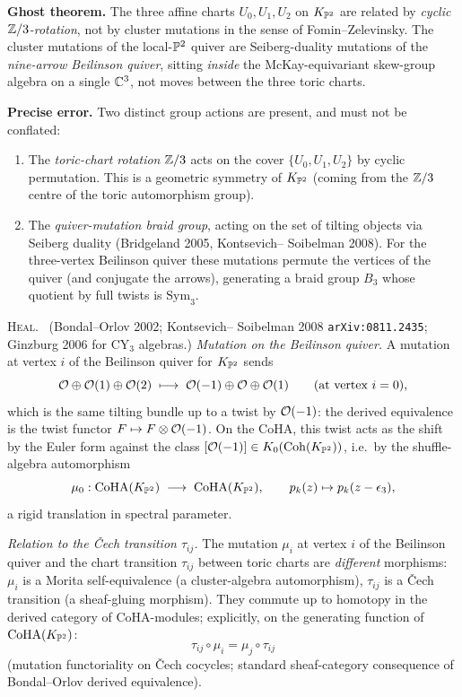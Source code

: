 \textbf{Ghost theorem.} The three affine charts $U_0,U_1,U_2$ on
$K_{\mathbb{P}^2}$ are related by \emph{cyclic $\mathbb{Z}/3$-rotation}, not by
cluster mutations in the sense of Fomin--Zelevinsky. The cluster
mutations of the local-$\mathbb{P}^2$ quiver are Seiberg-duality mutations of
the \emph{nine-arrow Beilinson quiver}, sitting \emph{inside} the
McKay-equivariant skew-group algebra on a single $\mathbb{C}^3$, not moves
between the three toric charts.

\textbf{Precise error.} Two distinct group actions are present, and must
not be conflated:
\begin{enumerate}
\item The \emph{toric-chart rotation} $\mathbb{Z}/3$ acts on the cover
$\{U_0,U_1,U_2\}$ by cyclic permutation. This is a geometric symmetry
of $K_{\mathbb{P}^2}$ (coming from the $\mathbb{Z}/3$ centre of the toric
automorphism group).
\item The \emph{quiver-mutation braid group}, acting on the set of
tilting objects via Seiberg duality (Bridgeland 2005, Kontsevich--
Soibelman 2008). For the three-vertex Beilinson quiver these mutations
permute the vertices of the quiver (and conjugate the arrows),
generating a braid group $B_3$ whose quotient by full twists is
$\mathrm{Sym}_3$.
\end{enumerate}

\textsc{Heal.} \ClaimStatusTheorem\ (Bondal--Orlov 2002; Kontsevich--
Soibelman 2008 \texttt{arXiv:0811.2435}; Ginzburg 2006 for CY$_3$
algebras.) \emph{Mutation on the Beilinson quiver.} A mutation at vertex
$i$ of the Beilinson quiver for $K_{\mathbb{P}^2}$ sends
\[
\mathcal{O}\oplus\mathcal{O}(1)\oplus\mathcal{O}(2)\;\longmapsto\;\mathcal{O}(-1)\oplus\mathcal{O}\oplus\mathcal{O}(1)
\qquad\text{(at vertex }i=0),
\]
which is the same tilting bundle up to a twist by $\mathcal{O}(-1)$: the
derived equivalence is the twist functor $F\mapsto F\otimes\mathcal{O}(-1)$.
On the CoHA, this twist acts as the shift by the Euler form against
the class $[\mathcal{O}(-1)]\in K_0(\mathrm{Coh}(K_{\mathbb{P}^2}))$, i.e.\ by the shuffle-
algebra automorphism
\[
\mu_0:\mathrm{CoHA}(K_{\mathbb{P}^2})\;\longrightarrow\;\mathrm{CoHA}(K_{\mathbb{P}^2}),
\qquad
p_k(z)\mapsto p_k(z-\epsilon_3),
\]
a rigid translation in spectral parameter.

\emph{Relation to the \v Cech transition $\tau_{ij}$.} The mutation
$\mu_i$ at vertex $i$ of the Beilinson quiver and the chart transition
$\tau_{ij}$ between toric charts are \emph{different} morphisms: $\mu_i$
is a Morita self-equivalence (a cluster-algebra automorphism), $\tau_{ij}$
is a \v Cech transition (a sheaf-gluing morphism). They commute up to
homotopy in the derived category of CoHA-modules; explicitly, on the
generating function of $\mathrm{CoHA}(K_{\mathbb{P}^2})$:
\[
\tau_{ij}\circ\mu_i=\mu_j\circ\tau_{ij}
\]
(mutation functoriality on \v Cech cocycles; standard sheaf-category
consequence of Bondal--Orlov derived equivalence).

